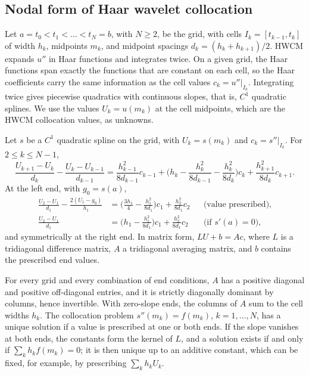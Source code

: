 \subsection{Nodal form of Haar wavelet collocation}
Let $a=t_0<t_1<\dots<t_N=b$, with $N\ge2$, be the grid, with cells $I_k=[t_{k-1},t_k]$ of width $h_k$,
midpoints $m_k$, and midpoint spacings $d_k=(h_k+h_{k+1})/2$. HWCM expands $u''$ in Haar functions and
integrates twice. On a given grid, the Haar functions span exactly the functions that are constant on each
cell, so the Haar coefficients carry the same information as the cell values $c_k=u''|_{I_k}$.
Integrating twice gives piecewise quadratics with continuous slopes, that is, $C^1$ quadratic splines.
We use the values $U_k=u(m_k)$ at the cell midpoints, which are the HWCM collocation values, as unknowns.

\begin{theorem}\label{thm:identity}
Let $s$ be a $C^1$ quadratic spline on the grid, with $U_k=s(m_k)$ and $c_k=s''|_{I_k}$. For $2\le k\le N-1$,
\begin{equation}\label{eq:interior}
\frac{U_{k+1}-U_k}{d_k}-\frac{U_k-U_{k-1}}{d_{k-1}}
=\frac{h_{k-1}^2}{8d_{k-1}}c_{k-1}+\Big(h_k-\frac{h_k^2}{8d_{k-1}}-\frac{h_k^2}{8d_k}\Big)c_k+\frac{h_{k+1}^2}{8d_k}c_{k+1}.
\end{equation}
At the left end, with $g_0=s(a)$,
\begin{align}
\frac{U_2-U_1}{d_1}-\frac{2(U_1-g_0)}{h_1}&=\Big(\frac{3h_1}{4}-\frac{h_1^2}{8d_1}\Big)c_1+\frac{h_2^2}{8d_1}c_2 &&\text{(value prescribed)},\label{eq:dirrow}\\
\frac{U_2-U_1}{d_1}&=\Big(h_1-\frac{h_1^2}{8d_1}\Big)c_1+\frac{h_2^2}{8d_1}c_2 &&\text{(if } s'(a)=0),\label{eq:neurow}
\end{align}
and symmetrically at the right end. In matrix form, $LU+b=Ac$, where $L$ is a tridiagonal difference
matrix, $A$ a tridiagonal averaging matrix, and $b$ contains the prescribed end values.
\end{theorem}

\begin{corollary}\label{cor:ops}
For every grid and every combination of end conditions, $A$ has a positive diagonal and positive
off-diagonal entries, and it is strictly diagonally dominant by columns, hence invertible. With zero-slope ends, the columns of $A$
sum to the cell widths $h_k$. The collocation problem $s''(m_k)=f(m_k)$, $k=1,\dots,N$, has a
unique solution if a value is prescribed at one or both ends. If the slope vanishes at both ends, the
constants form the kernel of $L$, and a solution exists if and only if $\sum_kh_kf(m_k)=0$; it is then
unique up to an additive constant, which can be fixed, for example, by prescribing $\sum_kh_kU_k$.
\end{corollary}


